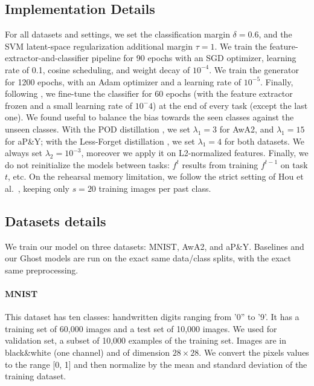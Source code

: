 \subsection{Implementation Details} For all datasets and settings, we set the classification margin
$\delta=0.6$, and the SVM latent-space regularization additional margin $\tau=1$. We train the
feature-extractor-and-classifier pipeline for 90 epochs with an SGD optimizer, learning rate of 0.1,
cosine scheduling, and weight decay of $10^{-4}$. We train the generator for 1200 epochs, with an
Adam optimizer and a learning rate of $10^{-5}$. Finally, following
\citet{hou2019ucir,douillard2020podnet}, we fine-tune the classifier for 60 epochs (with the feature
extractor frozen and a small learning rate of $10^-4$) at the end of every task (except the last
one). We found useful to balance the bias towards the seen classes against the unseen classes. With
the POD distillation \citet{douillard2020podnet}, we set $\lambda_1=3$  for AwA2, and $\lambda_1=15$
for aP\&Y; with the Less-Forget distillation \citet{hou2019ucir}, we set $\lambda_1=4$ for both
datasets. We always set $\lambda_2=10^{-3}$, moreover we apply it on L2-normalized features.
Finally, we do not reinitialize the models between tasks: $f^t$ results from training $f^{t-1}$ on
task $t$, etc. On the rehearsal memory limitation, we follow the strict setting of Hou et
al.~\citet{hou2019ucir}, keeping only $s=20$ training images per past class.

\subsection{Datasets details}

We train our model on three datasets: MNIST, AwA2, and aP\&Y. Baselines and our Ghost models are run
on the exact same data/class splits, with the exact same preprocessing.

\paragraph{MNIST} This dataset has ten classes: handwritten digits ranging from '0'' to '9'. It has
a training set of 60,000 images and a test set of 10,000 images. We used for validation set, a
subset of 10,000 examples of the training set. Images are in black\&white (one channel) and of
dimension $28\times28$. We convert the pixels values to the range [0, 1] and then normalize by the
mean and standard deviation of the training dataset.

